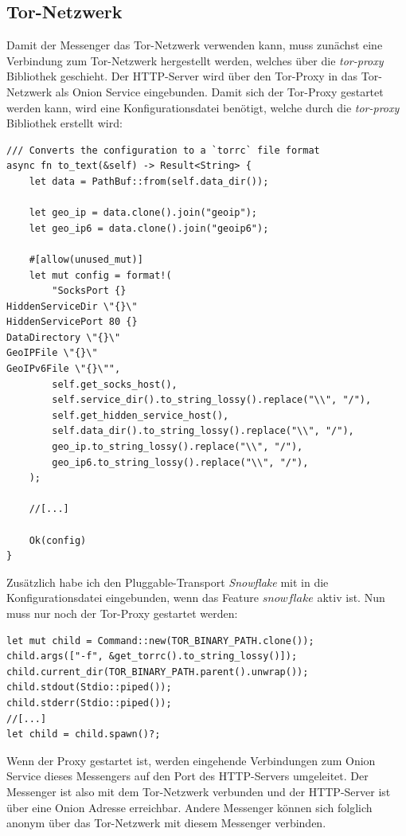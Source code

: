 \documentclass[a4paper,ngerman, headheight=28pt,12pt, footheight=27pt]{scrartcl}
\begin{document}
\subsection{Tor-Netzwerk}
Damit der Messenger das Tor-Netzwerk verwenden kann, muss zunächst eine Verbindung zum Tor-Netzwerk hergestellt werden, welches über die \textit{tor-proxy} Bibliothek geschieht. Der HTTP-Server wird über den Tor-Proxy in das Tor-Netzwerk als Onion Service eingebunden. Damit sich der Tor-Proxy gestartet werden kann, wird eine Konfigurationsdatei benötigt, welche durch die \textit{tor-proxy} Bibliothek erstellt wird:
\begin{verbatim}
/// Converts the configuration to a `torrc` file format
async fn to_text(&self) -> Result<String> {
    let data = PathBuf::from(self.data_dir());

    let geo_ip = data.clone().join("geoip");
    let geo_ip6 = data.clone().join("geoip6");

    #[allow(unused_mut)]
    let mut config = format!(
        "SocksPort {}
HiddenServiceDir \"{}\"
HiddenServicePort 80 {}
DataDirectory \"{}\"
GeoIPFile \"{}\"
GeoIPv6File \"{}\"",
        self.get_socks_host(),
        self.service_dir().to_string_lossy().replace("\\", "/"),
        self.get_hidden_service_host(),
        self.data_dir().to_string_lossy().replace("\\", "/"),
        geo_ip.to_string_lossy().replace("\\", "/"),
        geo_ip6.to_string_lossy().replace("\\", "/"),
    );

    //[...]

    Ok(config)
}
\end{verbatim}
Zusätzlich habe ich den Pluggable-Transport \textit{Snowflake} mit in die Konfigurationsdatei eingebunden, wenn das Feature $snowflake$ aktiv ist.
Nun muss nur noch der Tor-Proxy gestartet werden:
\begin{verbatim}
let mut child = Command::new(TOR_BINARY_PATH.clone());
child.args(["-f", &get_torrc().to_string_lossy()]);
child.current_dir(TOR_BINARY_PATH.parent().unwrap());
child.stdout(Stdio::piped());
child.stderr(Stdio::piped());
//[...]
let child = child.spawn()?;
\end{verbatim}
Wenn der Proxy gestartet ist, werden eingehende Verbindungen zum Onion Service dieses Messengers auf den Port des HTTP-Servers umgeleitet.
Der Messenger ist also mit dem Tor-Netzwerk verbunden und der HTTP-Server ist über eine Onion Adresse erreichbar. Andere Messenger können sich folglich anonym über das Tor-Netzwerk mit diesem Messenger verbinden.
\end{document}
